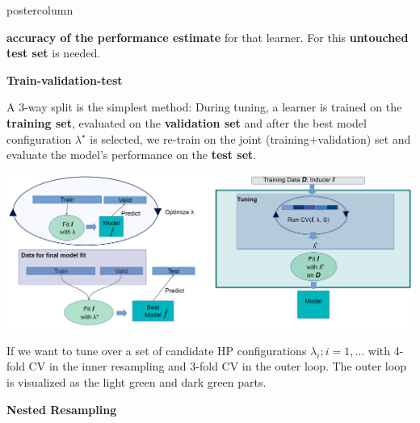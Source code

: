 \documentclass{beamer}
\newlength{\columnheight} %
\begin{document}
\begin{frame}[fragile]{}
\begin{columns}
  \begin{column}{.31\textwidth}
\begin{beamercolorbox}[center]{postercolumn}
\begin{minipage}{.98\textwidth}
\parbox[t][\columnheight]{\textwidth}{
  \begin{myblock}{}
  \textbf{accuracy of the performance estimate} for that learner. For this \textbf{untouched test set} is needed.
  \begin{codebox} \textbf{Train-validation-test}	\end{codebox}
  A 3-way split is the simplest method:
    During tuning, a learner is trained on the \textbf{training set}, evaluated on the  \textbf{validation set} and after the best model configuration $\lambda^\star$ is selected, we re-train on the joint (training+validation) set and evaluate the model's performance on the \textbf{test set}.\\

\begin{center}
             \includegraphics[width=1\columnwidth]{img/tuning_1.PNG}
               \end{center}

\hspace*{1ex}

If we want to tune over a set of candidate HP configurations $\lambda_i; i = 1, \dots$ with 4-fold CV in the inner resampling and 3-fold CV in the outer loop. The outer loop is visualized as the light green and dark green parts.

 \begin{codebox} \textbf{Nested Resampling}	\end{codebox}
 

\end{myblock}}
\end{minipage}
\end{beamercolorbox}
\end{column}
\end{columns}
\end{frame}
\end{document}
